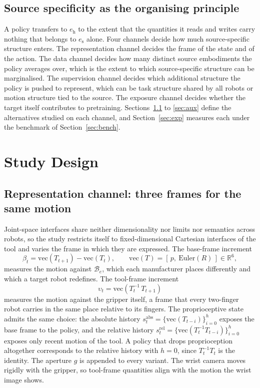 \subsection{Source specificity as the organising principle}
\label{sec:principle}

A policy transfers to $e_{\mathrm{h}}$ to the extent that the quantities it reads and writes carry nothing that belongs to $e_{\mathrm{s}}$ alone. Four channels decide how much source-specific structure enters. The representation channel decides the frame of the state and of the action. The data channel decides how many distinct source embodiments the policy averages over, which is the extent to which source-specific structure can be marginalised. The supervision channel decides which additional structure the policy is pushed to represent, which can be task structure shared by all robots or motion structure tied to the source. The exposure channel decides whether the target itself contributes to pretraining. Sections~\ref{sec:frames} to \ref{sec:aux} define the alternatives studied on each channel, and Section~\ref{sec:exp} measures each under the benchmark of Section~\ref{sec:bench}.

\section{Study Design}
\label{sec:design}

\subsection{Representation channel: three frames for the same motion}
\label{sec:frames}

Joint-space interfaces share neither dimensionality nor limits nor semantics across robots, so the study restricts itself to fixed-dimensional Cartesian interfaces of the tool and varies the frame in which they are expressed. The base-frame increment
\begin{equation}
\beta_t = \mathrm{vec}(T_{t+1}) - \mathrm{vec}(T_t), \qquad \mathrm{vec}(T) = [\,p,\ \mathrm{Euler}(R)\,] \in \mathbb{R}^6,
\end{equation}
measures the motion against $\mathcal{B}_e$, which each manufacturer places differently and which a target robot redefines. The tool-frame increment
\begin{equation}
\upsilon_t = \mathrm{vec}\!\left(T_t^{-1}\,T_{t+1}\right)
\end{equation}
measures the motion against the gripper itself, a frame that every two-finger robot carries in the same place relative to its fingers. The proprioceptive state admits the same choice: the absolute history $s^{\mathrm{abs}}_t = \{\mathrm{vec}(T_{t-i})\}_{i=0}^{h}$ exposes the base frame to the policy, and the relative history $s^{\mathrm{rel}}_t = \{\mathrm{vec}(T_t^{-1}T_{t-i})\}_{i=0}^{h}$ exposes only recent motion of the tool. A policy that drops proprioception altogether corresponds to the relative history with $h = 0$, since $T_t^{-1}T_t$ is the identity. The aperture $g$ is appended to every variant. The wrist camera moves rigidly with the gripper, so tool-frame quantities align with the motion the wrist image shows.


